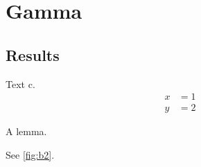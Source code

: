 \chapter{Gamma}
\section{Results}\label{sec:c}
Text c.
\begin{align}
  x &= 1 \label{eq:c1}\\
  y &= 2 \label{eq:c2}
\end{align}
\begin{lemma}\label{lem:c} A lemma. \end{lemma}
See \cref{fig:b2}.
